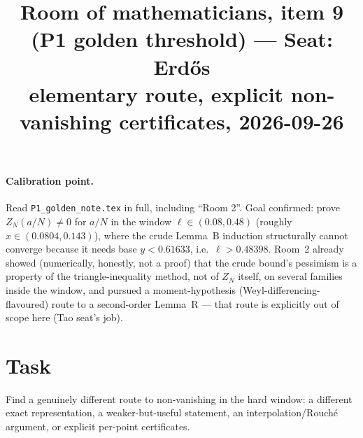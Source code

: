\documentclass[11pt]{article}
\title{Room of mathematicians, item 9 (P1 golden threshold) --- Seat: Erd\H{o}s\\
\small elementary route, explicit non-vanishing certificates, 2026-09-26}
\date{}
\begin{document}
\maketitle

\paragraph{Calibration point.} Read \texttt{P1\_golden\_note.tex} in full, including ``Room 2''.
Goal confirmed: prove $Z_N(a/N)\ne0$ for $a/N$ in the window $\ell\in(0.08,0.48)$ (roughly
$x\in(0.0804,0.143)$), where the crude Lemma~B induction structurally cannot converge because it
needs base $y<0.61633$, i.e.\ $\ell>0.48398$. Room~2 already showed (numerically, honestly, not a
proof) that the crude bound's pessimism is a property of the triangle-inequality method, not of
$Z_N$ itself, on several families inside the window, and pursued a moment-hypothesis
(Weyl-differencing-flavoured) route to a second-order Lemma~R --- that route is explicitly out of
scope here (Tao seat's job).

\section{Task}
Find a genuinely different route to non-vanishing in the hard window: a different exact
representation, a weaker-but-useful statement, an interpolation/Rouch\'e argument, or explicit
per-point certificates.
\end{document}
